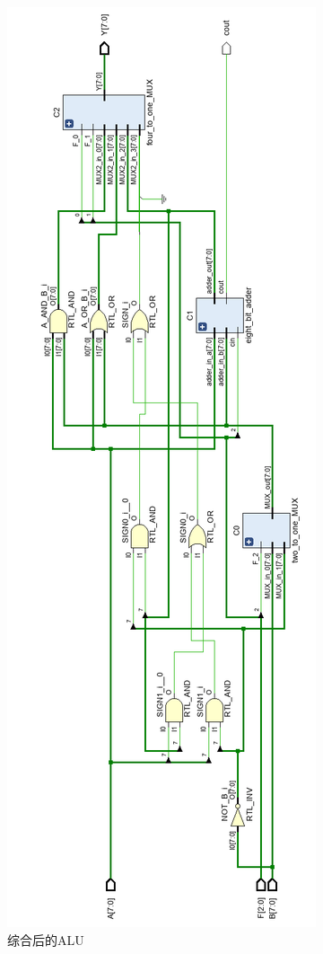 \documentclass[a4paper]{article}
\begin{document}
				\begin{figure}[htbp]
					\centering
					\includegraphics[scale=0.55]{综合后的ALU.png}
					\caption{综合后的ALU}
					\label{ALU after synthesis}
				\end{figure}
\end{document}
